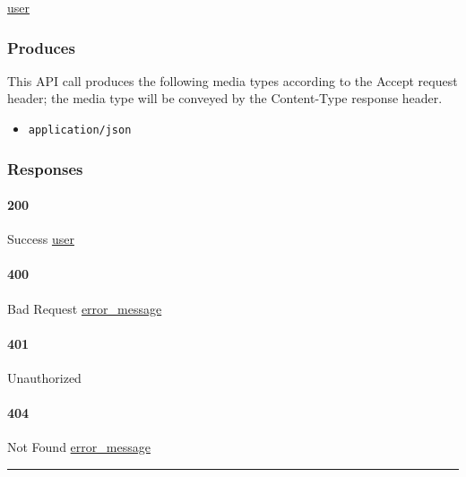 \protect\hyperlink{user}{user}

\hypertarget{produces-175}{%
\subsubsection{Produces}\label{produces-175}}

This API call produces the following media types according to the
{Accept} request header; the media type will be conveyed by the
{Content-Type} response header.

\begin{itemize}
\tightlist
\item
  \texttt{application/json}
\end{itemize}

\hypertarget{responses-181}{%
\subsubsection{Responses}\label{responses-181}}

\hypertarget{section-581}{%
\paragraph{200}\label{section-581}}

Success \protect\hyperlink{user}{user}

\hypertarget{section-582}{%
\paragraph{400}\label{section-582}}

Bad Request \protect\hyperlink{error_message}{error\_message}

\hypertarget{section-583}{%
\paragraph{401}\label{section-583}}

Unauthorized \protect\hyperlink{}{}

\hypertarget{section-584}{%
\paragraph{404}\label{section-584}}

Not Found \protect\hyperlink{error_message}{error\_message}

\begin{center}\rule{0.5\linewidth}{\linethickness}\end{center}


